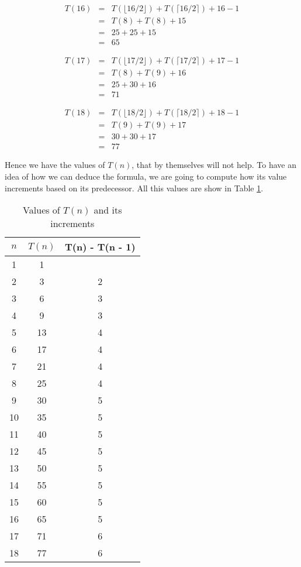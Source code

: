 \documentclass[12pt]{scrartcl}
\begin{document}
\begin{enumerate}
	\begin{eqnarray}
		T(16)		&	=	&	T(\lfloor 16 / 2 \rfloor) + T(\lceil 16 / 2 \rceil) + 16 - 1 \nonumber \\
					&	=	&	T(8)	+	T(8)	+ 15  \nonumber \\
					&	=	&	25 + 25 + 15  \nonumber \\
					&	=	&	65   \nonumber 
	\end{eqnarray}
	
	
	\begin{eqnarray}
		T(17)		&	=	&	T(\lfloor 17 / 2 \rfloor) + T(\lceil 17 / 2 \rceil) + 17 - 1 \nonumber \\
					&	=	&	T(8)	+	T(9)	+ 16  \nonumber \\
					&	=	&	25 + 30 + 16  \nonumber \\
					&	=	&	71   \nonumber 
	\end{eqnarray}
	
	\begin{eqnarray}
		T(18)		&	=	&	T(\lfloor 18 / 2 \rfloor) + T(\lceil 18 / 2 \rceil) + 18 - 1 \nonumber \\
					&	=	&	T(9)	+	T(9)	+ 17  \nonumber \\
					&	=	&	30 + 30 + 17  \nonumber \\
					&	=	&	77   \nonumber 
	\end{eqnarray}
	
	
	Hence we have the values of $T(n)$, that by themselves will not help. To have an idea of how we can deduce the formula, we are going to compute how its value increments based on its predecessor. All this values are show in Table \ref{incrementsOfT}.
	
	\begin{table}[ht!]
		\centering
		\caption{Values of $T(n)$ and its increments}
		\label{incrementsOfT}
		\begin{tabular}{|ccc|}
		\hline
		$n$		&	$T(n)$	&	T(n) - T(n - 1)	\\
		\hline
		1		&	1		&			\\
		2		&	3		&	2		\\
		3		&	6		&	3		\\
		4		&	9		&	3		\\
		5		&	13		&	4		\\
		6		&	17		&	4		\\
		7		&	21		&	4		\\
		8		&	25		&	4		\\
		9		&	30		&	5		\\
		10		&	35		&	5		\\
		11		&	40		&	5		\\
		12		&	45		&	5		\\
		13		&	50		&	5		\\
		14		&	55		&	5		\\
		15		&	60		&	5		\\
		16		&	65		&	5		\\
		17		&	71		&	6		\\
		18		&	77		&	6		\\
		\hline
		\end{tabular}
	\end{table}
	

\end{enumerate}
\end{document}
